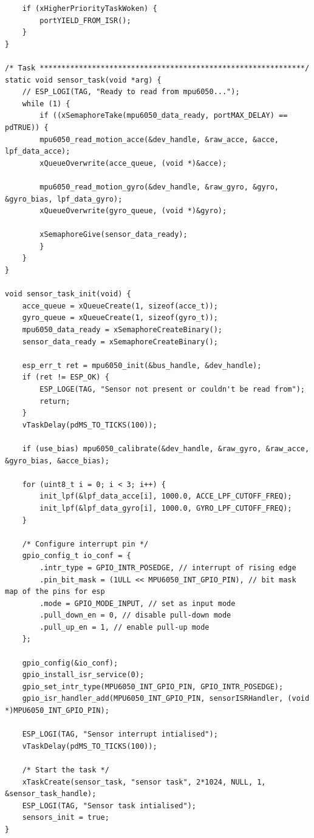 \begin{lstlisting}
    if (xHigherPriorityTaskWoken) {
        portYIELD_FROM_ISR();
    }
}

/* Task *************************************************************/
static void sensor_task(void *arg) {
    // ESP_LOGI(TAG, "Ready to read from mpu6050...");
    while (1) {
        if ((xSemaphoreTake(mpu6050_data_ready, portMAX_DELAY) == pdTRUE)) {
        mpu6050_read_motion_acce(&dev_handle, &raw_acce, &acce, lpf_data_acce);
        xQueueOverwrite(acce_queue, (void *)&acce);

        mpu6050_read_motion_gyro(&dev_handle, &raw_gyro, &gyro, &gyro_bias, lpf_data_gyro);
        xQueueOverwrite(gyro_queue, (void *)&gyro);

        xSemaphoreGive(sensor_data_ready); 
        }
    }
}

void sensor_task_init(void) {
    acce_queue = xQueueCreate(1, sizeof(acce_t));
    gyro_queue = xQueueCreate(1, sizeof(gyro_t));
    mpu6050_data_ready = xSemaphoreCreateBinary();
    sensor_data_ready = xSemaphoreCreateBinary();

    esp_err_t ret = mpu6050_init(&bus_handle, &dev_handle);
    if (ret != ESP_OK) {
        ESP_LOGE(TAG, "Sensor not present or couldn't be read from");
        return;
    }
    vTaskDelay(pdMS_TO_TICKS(100)); 

    if (use_bias) mpu6050_calibrate(&dev_handle, &raw_gyro, &raw_acce, &gyro_bias, &acce_bias);

    for (uint8_t i = 0; i < 3; i++) {
        init_lpf(&lpf_data_acce[i], 1000.0, ACCE_LPF_CUTOFF_FREQ);
        init_lpf(&lpf_data_gyro[i], 1000.0, GYRO_LPF_CUTOFF_FREQ);
    }

    /* Configure interrupt pin */
    gpio_config_t io_conf = {
        .intr_type = GPIO_INTR_POSEDGE, // interrupt of rising edge
        .pin_bit_mask = (1ULL << MPU6050_INT_GPIO_PIN), // bit mask map of the pins for esp
        .mode = GPIO_MODE_INPUT, // set as input mode
        .pull_down_en = 0, // disable pull-down mode
        .pull_up_en = 1, // enable pull-up mode
    };
    
    gpio_config(&io_conf);
    gpio_install_isr_service(0);
    gpio_set_intr_type(MPU6050_INT_GPIO_PIN, GPIO_INTR_POSEDGE);
    gpio_isr_handler_add(MPU6050_INT_GPIO_PIN, sensorISRHandler, (void *)MPU6050_INT_GPIO_PIN);

    ESP_LOGI(TAG, "Sensor interrupt intialised");
    vTaskDelay(pdMS_TO_TICKS(100)); 

    /* Start the task */
    xTaskCreate(sensor_task, "sensor task", 2*1024, NULL, 1, &sensor_task_handle);
    ESP_LOGI(TAG, "Sensor task intialised");
    sensors_init = true; 
}


\end{lstlisting}
